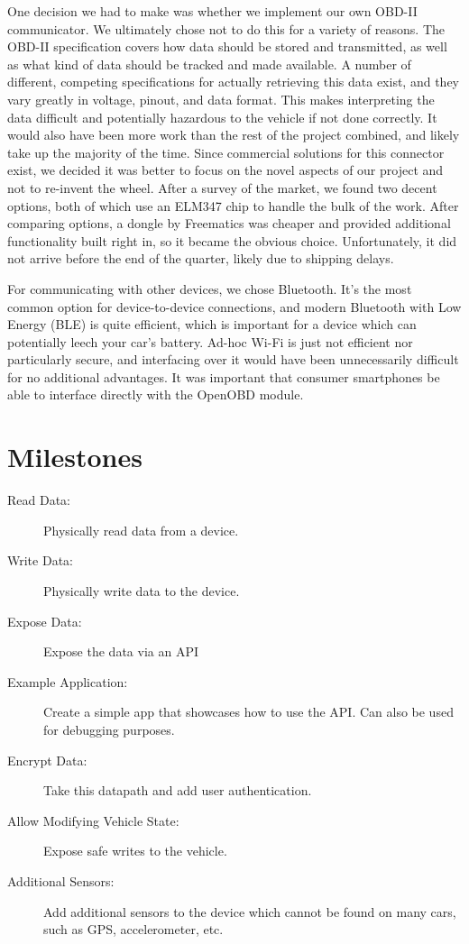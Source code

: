 \documentclass[10pt,letterpaper,unboxed,cm]{article}
\begin{document}
One decision we had to make was whether we implement our own OBD-II communicator. We ultimately chose not to do this for a variety of reasons. The OBD-II specification covers how data should be stored and transmitted, as well as what kind of data should be tracked and made available. A number of different, competing specifications for actually retrieving this data exist, and they vary greatly in voltage, pinout, and data format. This makes interpreting the data difficult and potentially hazardous to the vehicle if not done correctly. It would also have been more work than the rest of the project combined, and likely take up the majority of the time. Since commercial solutions for this connector exist, we decided it was better to focus on the novel aspects of our project and not to re-invent the wheel. After a survey of the market, we found two decent options, both of which use an ELM347 chip to handle the bulk of the work. After comparing options, a dongle by Freematics was cheaper and provided additional functionality built right in, so it became the obvious choice. Unfortunately, it did not arrive before the end of the quarter, likely due to shipping delays.

For communicating with other devices, we chose Bluetooth. It's the most common option for device-to-device connections, and modern Bluetooth with Low Energy (BLE) is quite efficient, which is important for a device which can potentially leech your car's battery. Ad-hoc Wi-Fi is just not efficient nor particularly secure, and interfacing over it would have been unnecessarily difficult for no additional advantages. It was important that consumer smartphones be able to interface directly with the OpenOBD module.

\newpage
\section{Milestones}

\begin{description}

\item [Read Data:] Physically read data from a device.
\item [Write Data:] Physically write data to the device.
\item [Expose Data:] Expose the data via an API
\item [Example Application:] Create a simple app that showcases how to use the API. Can also be used for debugging purposes.
\item [Encrypt Data:] Take this datapath and add user authentication.
\item [Allow Modifying Vehicle State:] Expose safe writes to the vehicle.
\item [Additional Sensors:] Add additional sensors to the device which cannot be found on many cars, such as GPS, accelerometer, etc.

\end{description}
\end{document}
